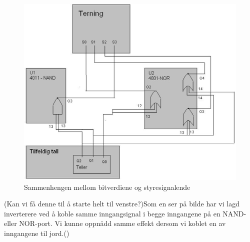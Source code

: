 \documentclass[12pt,norsk,a4paper]{article}
\begin{document}
    \begin{figure}[H]
    \includegraphics[scale=0.75]{Krestkortet.png}
    \caption{Sammenhengen mellom bitverdiene og styresignalende}
    \label{fig:kretskortet}
    \end{figure}

    (Kan vi få denne til å starte helt til venstre?)Som en ser på bilde har vi lagd inverterere ved å koble samme inngangsignal i begge inngangene på en NAND- eller NOR-port. Vi kunne oppnådd samme effekt dersom vi koblet en av inngangene til jord.()    

\clearpage
\end{document}

